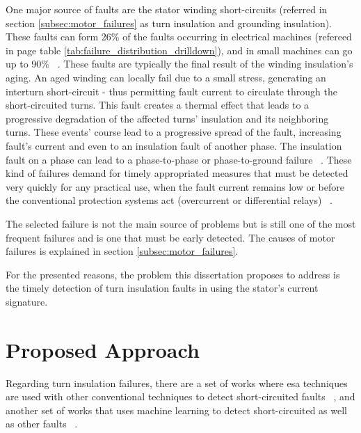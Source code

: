 One major source of faults are the stator winding short-circuits (referred in section \ref{subsec:motor_failures} as turn insulation and grounding insulation). These faults can form 26\% of the faults occurring in electrical machines (refereed in page \pageref{tab:failure_distribution_drilldown} table \ref{tab:failure_distribution_drilldown}), and in small machines can go up to 90\% ~\cite{Riera-Guasp2015}. These faults are typically the final result of the winding insulation's aging. An aged winding can locally fail due to a small stress, generating an interturn short-circuit - thus permitting fault current to circulate through the short-circuited turns. This fault creates a thermal effect that leads to a progressive degradation of the affected turns' insulation and its neighboring turns. These events' course lead to a progressive spread of the fault, increasing fault's current and even to an insulation fault of another phase. The insulation fault on a phase can lead to a phase-to-phase or phase-to-ground failure ~\cite{Riera-Guasp2015}. These kind of failures demand for timely appropriated measures that must be detected very quickly for any practical use, when the fault current remains low or before the conventional protection systems act (overcurrent or differential relays) ~\cite{Riera-Guasp2015}.

The selected failure is not the main source of problems but is still one of the most frequent failures and is one that must be early detected. The causes of motor failures is explained in section \ref{subsec:motor_failures}.


For the presented reasons, the problem this dissertation proposes to address is the timely detection of turn insulation faults in  using the stator's current signature.



\section{Proposed Approach} %
\label{sec:proposed_approach}

Regarding turn insulation failures, there are a set of works where \Acrshort{esa} techniques are used with other conventional techniques to detect short-circuited faults ~\cite{Cheng2011, Joksimovic2013, Cruz2001, Cabanas2013, Gandhi2011, Kia2013, M.a2014, Bouzid2013, Bakhri2012}, and another set of works that uses machine learning to detect short-circuited as well as other faults  ~\cite{Ourici2012, Toma2011, Wolkiewicz2013, Patel2016, Jagadanand2015}.

